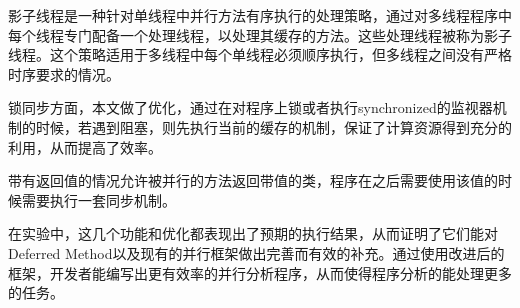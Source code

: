 影子线程是一种针对单线程中并行方法有序执行的处理策略，通过对多线程程序中每个线程专门配备一个处理线程，以处理其缓存的方法。这些处理线程被称为影子线程。这个策略适用于多线程中每个单线程必须顺序执行，但多线程之间没有严格时序要求的情况。

锁同步方面，本文做了优化，通过在对程序上锁或者执行synchronized的监视器机制的时候，若遇到阻塞，则先执行当前的缓存的机制，保证了计算资源得到充分的利用，从而提高了效率。

带有返回值的情况允许被并行的方法返回带值的类，程序在之后需要使用该值的时候需要执行一套同步机制。

在实验中，这几个功能和优化都表现出了预期的执行结果，从而证明了它们能对Deferred Method以及现有的并行框架做出完善而有效的补充。通过使用改进后的框架，开发者能编写出更有效率的并行分析程序，从而使得程序分析的能处理更多的任务。

